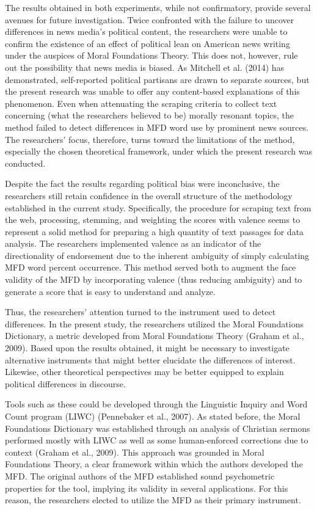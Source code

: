 \documentclass[english,,man]{apa6}
\begin{document}
The results obtained in both experiments, while not confirmatory,
provide several avenues for future investigation. Twice confronted with
the failure to uncover differences in news media's political content,
the researchers were unable to confirm the existence of an effect of
political lean on American news writing under the auspices of Moral
Foundations Theory. This does not, however, rule out the possibility
that news media is biased. As Mitchell et al. (2014) has demonstrated,
self-reported political partisans are drawn to separate sources, but the
present research was unable to offer any content-based explanations of
this phenomenon. Even when attenuating the scraping criteria to collect
text concerning (what the researchers believed to be) morally resonant
topics, the method failed to detect differences in MFD word use by
prominent news sources. The researchers' focus, therefore, turns toward
the limitations of the method, especially the chosen theoretical
framework, under which the present research was conducted.

Despite the fact the results regarding political bias were inconclusive,
the researchers still retain confidence in the overall structure of the
methodology established in the current study. Specifically, the
procedure for scraping text from the web, processing, stemming, and
weighting the scores with valence seems to represent a solid method for
preparing a high quantity of text passages for data analysis. The
researchers implemented valence as an indicator of the directionality of
endorsement due to the inherent ambiguity of simply calculating MFD word
percent occurrence. This method served both to augment the face validity
of the MFD by incorporating valence (thus reducing ambiguity) and to
generate a score that is easy to understand and analyze.

Thus, the researchers' attention turned to the instrument used to detect
differences. In the present study, the researchers utilized the Moral
Foundations Dictionary, a metric developed from Moral Foundations Theory
(Graham et al., 2009). Based upon the results obtained, it might be
necessary to investigate alternative instruments that might better
elucidate the differences of interest. Likewise, other theoretical
perspectives may be better equipped to explain political differences in
discourse.

Tools such as these could be developed through the Linguistic Inquiry
and Word Count program (LIWC) (Pennebaker et al., 2007). As stated
before, the Moral Foundations Dictionary was established through an
analysis of Christian sermons performed mostly with LIWC as well as some
human-enforced corrections due to context (Graham et al., 2009). This
approach was grounded in Moral Foundations Theory, a clear framework
within which the authors developed the MFD. The original authors of the
MFD established sound psychometric properties for the tool, implying its
validity in several applications. For this reason, the researchers
elected to utilize the MFD as their primary instrument.
\end{document}
